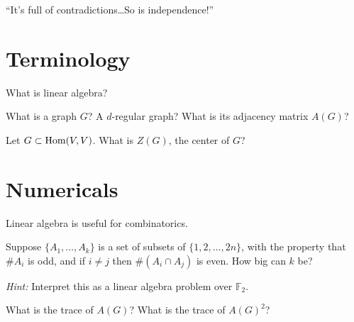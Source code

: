 \documentclass{homework}
\author{Jim Fowler}
\begin{document}
\maketitle

\begin{inspiration}
  ``It's full of contradictions\ldots So is independence!''  
\end{inspiration}

\section{Terminology}

\begin{problem}
  What is linear algebra?
\end{problem}

\begin{problem}
  What is a graph $G$?  A $d$-regular graph?  What is its adjacency matrix $A(G)$?
\end{problem}

\begin{problem}
  Let $G \subset \operatorname{Hom}(V,V)$.  What is $Z(G)$, the center of $G$?
\end{problem}

\section{Numericals}

\begin{problem}
  Linear algebra is useful for combinatorics.
  
  Suppose $\{ A_1, \ldots, A_k \}$ is a set of subsets of $\{1,2,\ldots,2n\}$, with the property that $\# A_i$ is odd, and if $i \neq j$ then $\# (A_i \cap A_j)$ is even.  How big can $k$ be?

  \textit{Hint:} Interpret this as a linear algebra problem over $\mathbb{F}_2$.
\end{problem}

\begin{problem}\label{trace-of-adjacency}What is the trace of $A(G)$?  What is the trace of $A(G)^2$?
\end{problem}
\end{document}
